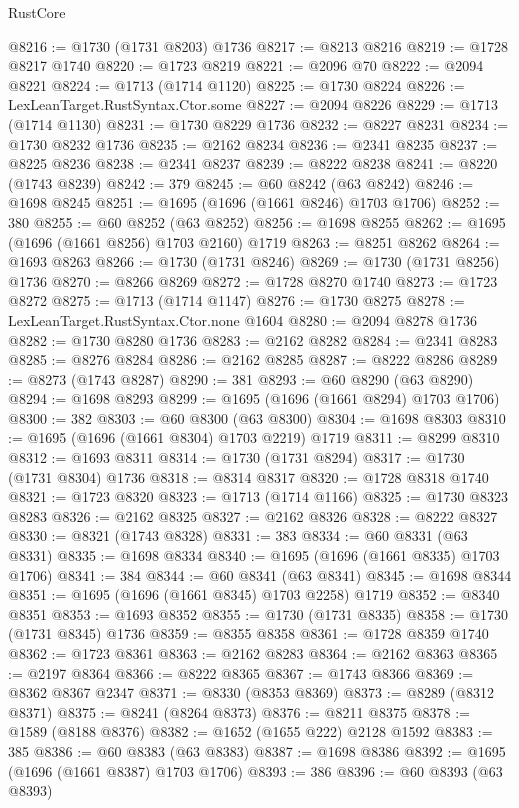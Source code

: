 \begin{lexlean}{RustCore}
\begin{coremodule}
@8216 := @1730 (@1731 @8203) @1736
@8217 := @8213 @8216
@8219 := @1728 @8217 @1740
@8220 := @1723 @8219
@8221 := @2096 @70
@8222 := @2094 @8221
@8224 := @1713 (@1714 @1120)
@8225 := @1730 @8224
@8226 := LexLeanTarget.RustSyntax.Ctor.some
@8227 := @2094 @8226
@8229 := @1713 (@1714 @1130)
@8231 := @1730 @8229 @1736
@8232 := @8227 @8231
@8234 := @1730 @8232 @1736
@8235 := @2162 @8234
@8236 := @2341 @8235
@8237 := @8225 @8236
@8238 := @2341 @8237
@8239 := @8222 @8238
@8241 := @8220 (@1743 @8239)
@8242 := 379
@8245 := @60 @8242 (@63 @8242)
@8246 := @1698 @8245
@8251 := @1695 (@1696 (@1661 @8246) @1703 @1706)
@8252 := 380
@8255 := @60 @8252 (@63 @8252)
@8256 := @1698 @8255
@8262 := @1695 (@1696 (@1661 @8256) @1703 @2160) @1719
@8263 := @8251 @8262
@8264 := @1693 @8263
@8266 := @1730 (@1731 @8246)
@8269 := @1730 (@1731 @8256) @1736
@8270 := @8266 @8269
@8272 := @1728 @8270 @1740
@8273 := @1723 @8272
@8275 := @1713 (@1714 @1147)
@8276 := @1730 @8275
@8278 := LexLeanTarget.RustSyntax.Ctor.none @1604
@8280 := @2094 @8278 @1736
@8282 := @1730 @8280 @1736
@8283 := @2162 @8282
@8284 := @2341 @8283
@8285 := @8276 @8284
@8286 := @2162 @8285
@8287 := @8222 @8286
@8289 := @8273 (@1743 @8287)
@8290 := 381
@8293 := @60 @8290 (@63 @8290)
@8294 := @1698 @8293
@8299 := @1695 (@1696 (@1661 @8294) @1703 @1706)
@8300 := 382
@8303 := @60 @8300 (@63 @8300)
@8304 := @1698 @8303
@8310 := @1695 (@1696 (@1661 @8304) @1703 @2219) @1719
@8311 := @8299 @8310
@8312 := @1693 @8311
@8314 := @1730 (@1731 @8294)
@8317 := @1730 (@1731 @8304) @1736
@8318 := @8314 @8317
@8320 := @1728 @8318 @1740
@8321 := @1723 @8320
@8323 := @1713 (@1714 @1166)
@8325 := @1730 @8323 @8283
@8326 := @2162 @8325
@8327 := @2162 @8326
@8328 := @8222 @8327
@8330 := @8321 (@1743 @8328)
@8331 := 383
@8334 := @60 @8331 (@63 @8331)
@8335 := @1698 @8334
@8340 := @1695 (@1696 (@1661 @8335) @1703 @1706)
@8341 := 384
@8344 := @60 @8341 (@63 @8341)
@8345 := @1698 @8344
@8351 := @1695 (@1696 (@1661 @8345) @1703 @2258) @1719
@8352 := @8340 @8351
@8353 := @1693 @8352
@8355 := @1730 (@1731 @8335)
@8358 := @1730 (@1731 @8345) @1736
@8359 := @8355 @8358
@8361 := @1728 @8359 @1740
@8362 := @1723 @8361
@8363 := @2162 @8283
@8364 := @2162 @8363
@8365 := @2197 @8364
@8366 := @8222 @8365
@8367 := @1743 @8366
@8369 := @8362 @8367 @2347
@8371 := @8330 (@8353 @8369)
@8373 := @8289 (@8312 @8371)
@8375 := @8241 (@8264 @8373)
@8376 := @8211 @8375
@8378 := @1589 (@8188 @8376)
@8382 := @1652 (@1655 @222) @2128 @1592
@8383 := 385
@8386 := @60 @8383 (@63 @8383)
@8387 := @1698 @8386
@8392 := @1695 (@1696 (@1661 @8387) @1703 @1706)
@8393 := 386
@8396 := @60 @8393 (@63 @8393)

\end{coremodule}
\end{lexlean}
